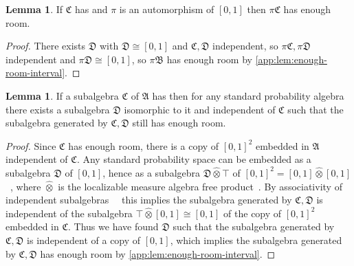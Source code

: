 \documentclass[
  sigconf,
  screen, ]{acmart}
\theoremstyle{definition}
\newtheorem{lemma}[theorem]{Lemma}
\newcommand\frakA{\mathfrak A}
\newcommand\frakB{\mathfrak B}
\newcommand\frakC{\mathfrak C}
\newcommand\frakD{\mathfrak D}
\newcommand\fremlinf[3]{\cite[\href{https://www1.essex.ac.uk/maths/people/fremlin/chap#2.pdf\#page=#3}{#1}]{fremlin2000measure}}
\newcommand\lmafp{\mathbin{\hat\otimes}}
\begin{document}
\begin{lemma} \label{app:lem:enough-room-iso}
  If $\frakC$ has 
  and $\pi$ is an automorphism of $[0,1]$
  then $\pi \frakC$ has enough room.
\end{lemma}
\begin{proof}
  There exists $\frakD$ with $\frakD\cong[0,1]$ and $\frakC,\frakD$ independent,
  so $\pi\frakC,\pi\frakD$ independent and $\pi\frakD\cong[0,1]$,
  so $\pi\frakB$ has enough room by \cref{app:lem:enough-room-interval}.
\end{proof}

\begin{lemma}
  If a subalgebra $\frakC$ of $\frakA$ has 
  then for any standard probability algebra there exists
  a subalgebra $\frakD$ isomorphic to it and independent of $\frakC$
  such that the subalgebra generated by $\frakC,\frakD$
  still has enough room.
\end{lemma}
\begin{proof}
  Since $\frakC$ has enough room,
  there is a copy of $[0,1]^2$ embedded in $\frakA$ independent of $\frakC$.
  Any standard probability space can be embedded
  as a subalgebra $\frakD$ of $[0,1]$,
  hence as a subalgebra $\frakD \lmafp\top$
  of $[0,1]^2 = [0,1]\lmafp[0,1]$~\fremlinf{325F}{32}{32},
  where $\lmafp$ is the localizable measure algebra free product~\fremlinf{325E}{32}{32}.
  By associativity of independent subalgebras~\fremlinf{272K}{27}{14}~\fremlinf{325X(g)}{32}{37}
  this implies the subalgebra generated by $\frakC,\frakD$
  is independent of the subalgebra $\top \lmafp[0,1] \cong [0,1]$
  of the copy of $[0,1]^2$ embedded in $\frakC$.
  Thus we have found $\frakD$ such that the subalgebra generated by $\frakC,\frakD$
  is independent of a copy of $[0,1]$,
  which implies the subalgebra generated by $\frakC,\frakD$
  has enough room by \cref{app:lem:enough-room-interval}.
\end{proof}
\end{document}
